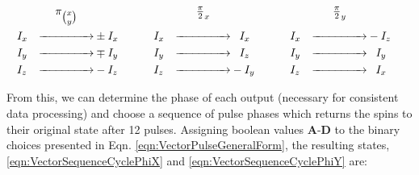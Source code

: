 \documentclass[PaulGanssle-Thesis.tex]{subfiles}
\begin{document}
\begin{equation}
\label{eqn:RotationCoordinateTransforms}
\begin{aligned}
&       & \specialcell{\hfill{}\pi_{\tbinom{x}{y}}\hfill{}}          &           &\hspace*{7.5mm}&       & \specialcell{\hfill{}\tfrac{\pi}{2}_{x}\hfill{}}           &        &\hspace*{7.5mm}&       & \specialcell{\hfill{}\tfrac{\pi}{2}_{y}\hfill{}}           &        & \\                                      
& I_{x} & \xrightarrow{\hspace*{15mm}} & \pm I_{x} && I_{x} & \xrightarrow{\hspace*{15mm}} & \phantom{-}I_{x}  && I_{x} & \xrightarrow{\hspace*{15mm}} & -I_{z} & \\
& I_{y} & \xrightarrow{\hspace*{15mm}} & \mp I_{y} && I_{y} & \xrightarrow{\hspace*{15mm}} & \phantom{-}I_{z}  && I_{y} & \xrightarrow{\hspace*{15mm}} & \phantom{-}I_{y}  & \\
& I_{z} & \xrightarrow{\hspace*{15mm}} & -I_{z}    && I_{z} & \xrightarrow{\hspace*{15mm}} & -I_{y} && I_{z} & \xrightarrow{\hspace*{15mm}} & \phantom{-}I_{x}  & 
\end{aligned}
\end{equation}

From this, we can determine the phase of each output (necessary for consistent data processing) and choose a sequence of pulse phases which returns the spins to their original state after 12 pulses. Assigning boolean values $\mathbf{A}$-$\mathbf{D}$ to the binary choices presented in Eqn. \ref{eqn:VectorPulseGeneralForm}, the resulting states, \ref{eqn:VectorSequenceCyclePhiX} and \ref{eqn:VectorSequenceCyclePhiY} are: 
\end{document}

